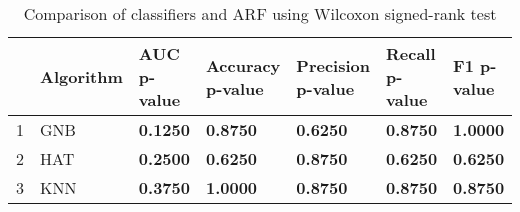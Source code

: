 \begin{table}
\footnotesize
\caption{Comparison of classifiers and ARF using Wilcoxon signed-rank test}
\label{tab:wilcoxon comparison}
\begin{tabular}{lllllll}
\hline
 & Algorithm & AUC p-value & Accuracy p-value & Precision p-value & Recall p-value & F1 p-value \\
\hline
1 & GNB & \textbf{0.1250} & \textbf{0.8750} & \textbf{0.6250} & \textbf{0.8750} & \textbf{1.0000} \\
2 & HAT & \textbf{0.2500} & \textbf{0.6250} & \textbf{0.8750} & \textbf{0.6250} & \textbf{0.6250} \\
3 & KNN & \textbf{0.3750} & \textbf{1.0000} & \textbf{0.8750} & \textbf{0.8750} & \textbf{0.8750} \\
\hline
\end{tabular}
\end{table}
